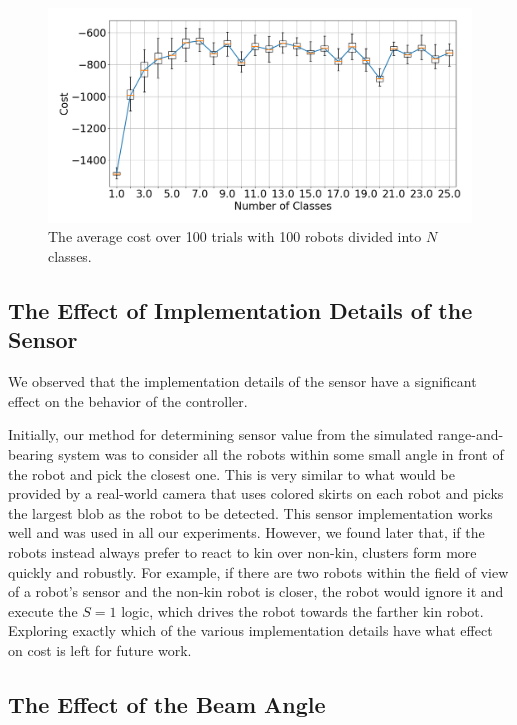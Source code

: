 \documentclass[letterpaper, 10 pt, conference]{ieeeconf}
\begin{document}
\begin{figure}[t]
  \centering
  \includegraphics[width=1\linewidth]{./images/num_classes_vs_cost_100_robots.png}
  \caption{The average cost over 100 trials with 100 robots divided into $N$ classes.}
  \label{fig:num_classes_100}
\end{figure}

\subsection{The Effect of Implementation Details of the Sensor} \label{section:sensor_impl}

We observed that the implementation details of the sensor have a significant
effect on the behavior of the controller.

Initially, our method for determining sensor value from the simulated
range-and-bearing system was to consider all the robots within some small angle
in front of the robot and pick the closest one. This is very similar to what
would be provided by a real-world camera that uses colored skirts on each robot
and picks the largest blob as the robot to be detected. This sensor
implementation works well and was used in all our experiments. However,
we found later that, if the robots instead always prefer to react to kin over
non-kin, clusters form more quickly and robustly. For example, if there are
two robots within the field of view of a robot's sensor and the non-kin robot is
closer, the robot would ignore it and execute the $S=1$ logic, which drives the
robot towards the farther kin robot. Exploring exactly which of the various
implementation details have what effect on cost is left for future work.

\subsection{The Effect of the Beam Angle} \label{sec:aperture_angle}
\end{document}
